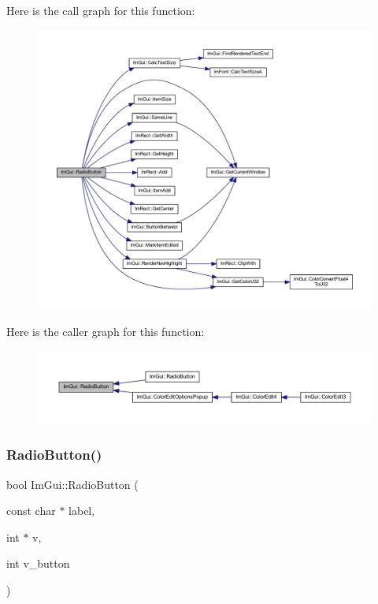 Here is the call graph for this function\+:
\nopagebreak
\begin{figure}[H]
\begin{center}
\leavevmode
\includegraphics[width=350pt]{namespace_im_gui_a6b146763845cbad5a4144772279631bc_cgraph}
\end{center}
\end{figure}
Here is the caller graph for this function\+:
\nopagebreak
\begin{figure}[H]
\begin{center}
\leavevmode
\includegraphics[width=350pt]{namespace_im_gui_a6b146763845cbad5a4144772279631bc_icgraph}
\end{center}
\end{figure}
\mbox{\label{namespace_im_gui_a018d2b61d2f00bb7a9dd2b1f933b93a5}} 
\subsubsection{\texorpdfstring{Radio\+Button()}{RadioButton()}\hspace{0.1cm}{\footnotesize\ttfamily [2/2]}}
{\footnotesize\ttfamily bool Im\+Gui\+::\+Radio\+Button (\begin{DoxyParamCaption}\item[{const char $\ast$}]{label,  }\item[{int $\ast$}]{v,  }\item[{int}]{v\+\_\+button }\end{DoxyParamCaption})}


